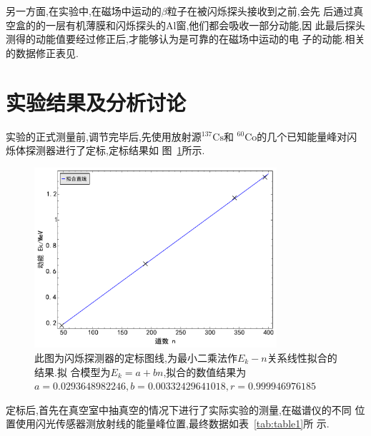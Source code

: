 \documentclass[aps,pre,12pt,preprint,onecolumn,showpacs,showkeys]{revtex4-1}
\begin{document}
另一方面,在实验中,在磁场中运动的$\beta$粒子在被闪烁探头接收到之前,会先
后通过真空盒的的一层有机薄膜和闪烁探头的Al窗,他们都会吸收一部分动能,因
此最后探头测得的动能值要经过修正后,才能够认为是可靠的在磁场中运动的电
子的动能.相关的数据修正表见\cite{Book}.

\section{实验结果及分析讨论}

实验的正式测量前,调节完毕后,先使用放射源$^{137}\text{Cs}$和
$^{60}\text{Co}$的几个已知能量峰对闪烁体探测器进行了定标,定标结果如
图~\ref{fig:plot1}所示.

\begin{figure}[htbp]
  \centering
\includegraphics[width=0.8\textwidth]{plot1.pdf}
\caption{\label{fig:plot1}%
此图为闪烁探测器的定标图线,为最小二乘法作$E_k - n$关系线性拟合的结果.拟%
合模型为$E_k = a + bn$,拟合的数值结果为$a = 0.0293648982246, b =%
0.00332429641018, r = 0.999946976185$}
\end{figure}


定标后,首先在真空室中抽真空的情况下进行了实际实验的测量,在磁谱仪的不同
位置使用闪光传感器测放射线的能量峰位置,最终数据如表~\ref{tab:table1}所
示.
\end{document}

